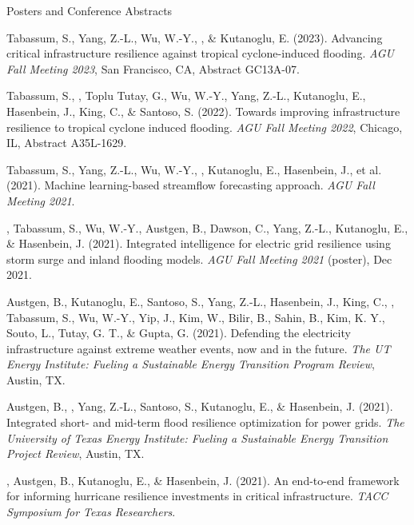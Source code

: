 \begin{rSection}{Posters and Conference Abstracts}
\begin{pubs}
    \item Tabassum, S., Yang, Z.-L., Wu, W.-Y., \me, \& Kutanoglu, E. (2023). Advancing critical infrastructure resilience against tropical cyclone-induced flooding. \textit{AGU Fall Meeting 2023}, San Francisco, CA, Abstract GC13A-07.

    \item Tabassum, S., \me, Toplu Tutay, G., Wu, W.-Y., Yang, Z.-L., Kutanoglu, E., Hasenbein, J., King, C., \& Santoso, S. (2022). Towards improving infrastructure resilience to tropical cyclone induced flooding. \textit{AGU Fall Meeting 2022}, Chicago, IL, Abstract A35L-1629.

    \item Tabassum, S., Yang, Z.-L., Wu, W.-Y., \me, Kutanoglu, E., Hasenbein, J., et al. (2021). Machine learning-based streamflow forecasting approach. \textit{AGU Fall Meeting 2021}.

    \item \me, Tabassum, S., Wu, W.-Y., Austgen, B., Dawson, C., Yang, Z.-L., Kutanoglu, E., \& Hasenbein, J. (2021). Integrated intelligence for electric grid resilience using storm surge and inland flooding models. \textit{AGU Fall Meeting 2021} (poster), Dec 2021.

    \item Austgen, B., Kutanoglu, E., Santoso, S., Yang, Z.-L., Hasenbein, J., King, C., \me, Tabassum, S., Wu, W.-Y., Yip, J., Kim, W., Bilir, B., Sahin, B., Kim, K. Y., Souto, L., Tutay, G. T., \& Gupta, G. (2021). Defending the electricity infrastructure against extreme weather events, now and in the future. \textit{The UT Energy Institute: Fueling a Sustainable Energy Transition Program Review}, Austin, TX.

    \item Austgen, B., \me, Yang, Z.-L., Santoso, S., Kutanoglu, E., \& Hasenbein, J. (2021). Integrated short- and mid-term flood resilience optimization for power grids. \textit{The University of Texas Energy Institute: Fueling a Sustainable Energy Transition Project Review}, Austin, TX.

    \item \me, Austgen, B., Kutanoglu, E., \& Hasenbein, J. (2021). An end-to-end framework for informing hurricane resilience investments in critical infrastructure. \textit{TACC Symposium for Texas Researchers}.
\end{pubs}
\end{rSection}
